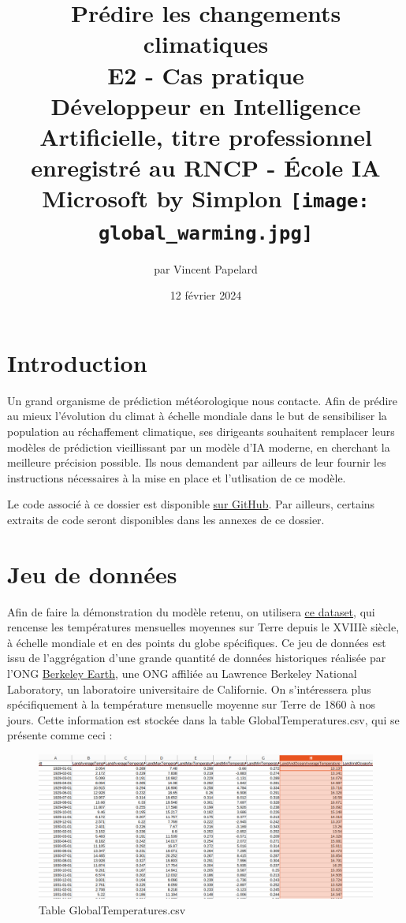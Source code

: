 \documentclass[french]{article}
\title{%
    \huge Prédire les changements climatiques  \\
    \bigskip
    \large E2 - Cas pratique \\ 
    Développeur en Intelligence Artificielle,
    titre professionnel enregistré au RNCP - École IA Microsoft by Simplon
    \vfill
    \texttt{[image: global\_warming.jpg]} %
    \vfill}
\date{12 février 2024}
\author{par Vincent Papelard}
\begin{document}
    \renewcommand{\contentsname}{Table des Matières}
    \maketitle
    \newpage
    \tableofcontents
    \newpage

    \section*{Introduction}
    Un grand organisme de prédiction météorologique nous contacte. Afin de prédire au mieux l'évolution du climat à échelle mondiale dans le but de sensibiliser la population au réchaffement climatique, ses dirigeants souhaitent remplacer leurs modèles de prédiction vieillissant par un modèle d'IA moderne, en cherchant la meilleure précision possible. Ils nous demandent par ailleurs de leur fournir les instructions nécessaires à la mise en place et l'utlisation de ce modèle.
    
    Le code associé à ce dossier est disponible \href{https://github.com/vinpap/predict_climate_change}{sur GitHub}. Par ailleurs, certains extraits de code seront disponibles dans les annexes de ce dossier.

    \section{Jeu de données}
    Afin de faire la démonstration du modèle retenu, on utilisera \href{https://www.kaggle.com/datasets/berkeleyearth/climate-change-earth-surface-temperature-data}{ce dataset}, qui rencense les températures mensuelles moyennes sur Terre depuis le XVIIIè siècle, à échelle mondiale et en des points du globe spécifiques. Ce jeu de données est issu de l'aggrégation d'une grande quantité de données historiques réalisée par l'ONG \href{http://berkeleyearth.org/about/}{Berkeley Earth}, une ONG affiliée au Lawrence Berkeley National Laboratory, un laboratoire universitaire de Californie.
    On s'intéressera plus spécifiquement à la température mensuelle moyenne sur Terre de 1860 à nos jours. Cette information est stockée dans la table GlobalTemperatures.csv, qui se présente comme ceci :
    
    \begin{figure}[h]
        \includegraphics[width=12cm]{dataset}
        \centering
        \caption{Table GlobalTemperatures.csv}
        \centering
    \end{figure}
\end{document}
